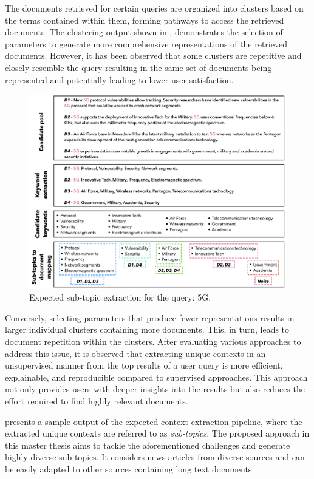 The documents retrieved for certain queries are organized into clusters based on the terms contained within them, forming pathways to access the retrieved documents. The clustering output shown in , demonstrates the selection of parameters to generate more comprehensive representations of the retrieved documents. However, it has been observed that some clusters are repetitive and closely resemble the query resulting in the same set of documents being represented and potentially leading to lower user satisfaction.

\begin{figure}[h]
	\centering
	\includegraphics[width=.99\textwidth]{images/keynotes_images/high_level_approach}
	\caption[Expected sub-topic retrieval.]{Expected sub-topic extraction for the query: 5G. \label{fig:proposal_idea}}
\end{figure}

Conversely, selecting parameters that produce fewer representations results in larger individual clusters containing more documents. This, in turn, leads to document repetition within the clusters. After evaluating various approaches to address this issue, it is observed that extracting unique contexts in an unsupervised manner from the top results of a user query is more efficient, explainable, and reproducible compared to supervised approaches. This approach not only provides users with deeper insights into the results but also reduces the effort required to find highly relevant documents. 

 presents a sample output of the expected context extraction pipeline, where the extracted unique contexts are referred to as \emph{sub-topics}. The proposed approach in this master thesis aims to tackle the aforementioned challenges and generate highly diverse sub-topics. It considers news articles from diverse sources and can be easily adapted to other sources containing long text documents.



